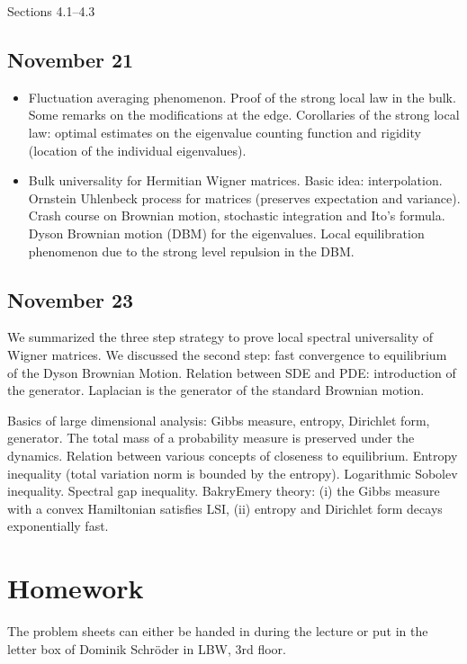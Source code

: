 \documentclass[letterpaper,10pt,english]{sphinxhowto}
\begin{document}
\sphinxAtStartPar
{}  Sections 4.1–4.3


\subsection{November 21}
\label{\detokenize{teaching/random_matrices_2017:november-21}}\begin{itemize}
\item {} 
\sphinxAtStartPar
Fluctuation averaging phenomenon. Proof of the strong local law in the bulk. Some remarks on the modifications at the edge. Corollaries of the strong local law: optimal estimates on the eigenvalue counting function and rigidity (location of the individual eigenvalues).

\item {} 
\sphinxAtStartPar
Bulk universality for Hermitian Wigner matrices. Basic idea: interpolation. Ornstein Uhlenbeck process for matrices (preserves expectation and variance). Crash course on Brownian motion, stochastic integration and Ito’s formula. Dyson Brownian motion (DBM) for the eigenvalues. Local equilibration phenomenon due to the strong level repulsion in the DBM.

\end{itemize}


\subsection{November 23}
\label{\detokenize{teaching/random_matrices_2017:november-23}}
\sphinxAtStartPar
We summarized the three step strategy to prove local spectral universality of Wigner matrices. We discussed the second step: fast convergence to equilibrium of the Dyson Brownian Motion. Relation between SDE and PDE: introduction of the generator. Laplacian is the generator of the standard Brownian motion.

\sphinxAtStartPar
Basics of large dimensional analysis: Gibbs measure, entropy, Dirichlet form, generator. The total mass of a probability measure is preserved under the dynamics. Relation between various concepts of closeness to equilibrium. Entropy inequality (total variation norm is bounded by the entropy). Logarithmic Sobolev inequality. Spectral gap inequality. Bakry\sphinxhyphen{}Emery theory: (i) the Gibbs measure with a convex Hamiltonian satisfies LSI, (ii) entropy and
Dirichlet form decays exponentially fast.


\section{Homework}
\label{\detokenize{teaching/random_matrices_2017:homework}}
\sphinxAtStartPar
The problem sheets can either be handed in during the lecture or put in the letter box of Dominik Schröder in LBW, 3rd floor.
\end{document}

